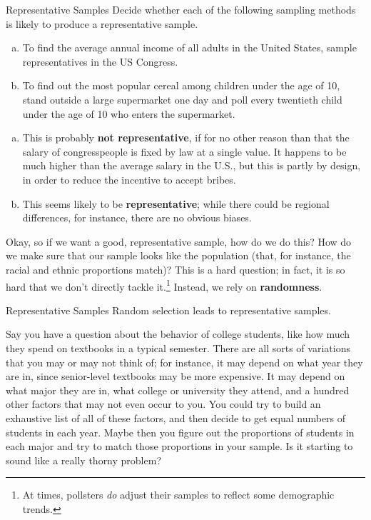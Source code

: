 \begin{example}[https://www.youtube.com/watch?v=f-RqidmHOjc&list=PLfmpjsIzhzttL_Uec2nCbDRcAcUF7NKG8&index=2]{Representative Samples}
Decide whether each of the following sampling methods is likely to produce a representative sample.

\begin{enumerate}[(a)]
\item To find the average annual income of all adults in the United States, sample representatives in the US Congress.
\item To find out the most popular cereal among children under the age of 10, stand outside a large supermarket one day and poll every twentieth child under the age of 10 who enters the supermarket.
\end{enumerate}

\sol
\begin{enumerate}[(a)]
\item This is probably \textbf{not representative}, if for no other reason than that the salary of congresspeople is fixed by law at a single value.  It happens to be much higher than the average salary in the U.S., but this is partly by design, in order to reduce the incentive to accept bribes.

\item This seems likely to be \textbf{representative}; while there could be regional differences, for instance, there are no obvious biases.
\end{enumerate}
\end{example}

Okay, so if we want a good, representative sample, how do we do this?  How do we make sure that our sample looks like the population (that, for instance, the racial and ethnic proportions match)?  This is a hard question; in fact, it is so hard that we don't directly tackle it.\footnote{At times, pollsters \emph{do} adjust their samples to reflect some demographic trends.}  Instead, we rely on \textbf{randomness}.

\begin{proc}{Representative Samples}
Random selection leads to representative samples.
\end{proc}

Say you have a question about the behavior of college students, like how much they spend on textbooks in a typical semester.  There are all sorts of variations that you may or may not think of; for instance, it may depend on what year they are in, since senior-level textbooks may be more expensive.  It may depend on what major they are in, what college or university they attend, and a hundred other factors that may not even occur to you.  You could try to build an exhaustive list of all of these factors, and then decide to get equal numbers of students in each year.  Maybe then you figure out the proportions of students in each major and try to match those proportions in your sample.  Is it starting to sound like a really thorny problem?

